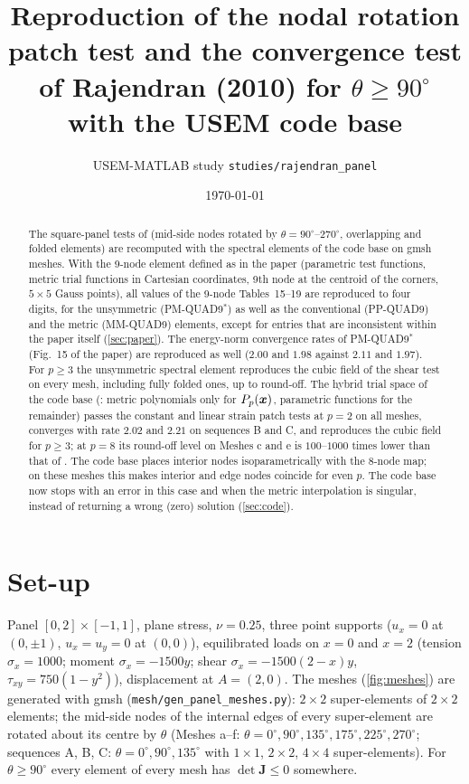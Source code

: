 \documentclass[10pt,a4paper]{article}
\title{Reproduction of the nodal rotation patch test and the convergence test of
       Rajendran (2010) for $\theta\ge90^\circ$ with the USEM code base}
\author{USEM-MATLAB study \texttt{studies/rajendran\_panel}}
\date{\today}
\begin{document}
\maketitle

\begin{abstract}
\noindent
The square-panel tests of \citet[Secs.~5.5--5.7]{Rajendran2010technique} (mid-side nodes
rotated by $\theta=90^\circ$--$270^\circ$, overlapping and folded elements) are recomputed
with the spectral elements of the code base on gmsh meshes. With the 9-node element defined
as in the paper (parametric test functions, metric trial functions in Cartesian coordinates,
9th node at the centroid of the corners, $5\times5$ Gauss points), all values of the 9-node
Tables~15--19 are reproduced to four digits, for the unsymmetric (PM-QUAD9$^\ast$) as well as
the conventional (PP-QUAD9) and the metric (MM-QUAD9) elements, except for entries that are
inconsistent within the paper itself (\cref{sec:paper}). The energy-norm convergence rates of
PM-QUAD9$^\ast$ (Fig.~15 of the paper) are reproduced as well ($2.00$ and $1.98$ against
$2.11$ and $1.97$). For $p\ge3$ the unsymmetric spectral element reproduces the cubic field of
the shear test on every mesh, including fully folded ones, up to round-off. The hybrid trial
space of the code base (\PH: metric polynomials only for $P_p(\bm{x})$, parametric functions for the
remainder) passes the constant and linear strain patch tests at $p=2$ on all meshes, converges
with rate $2.02$ and $2.21$ on sequences B and C, and reproduces the cubic field for $p\ge3$; at $p=8$
its round-off level on Meshes c and e is $100$--$1000$ times lower than that of \PM. The code base places interior nodes
isoparametrically with the 8-node map; on these meshes this makes interior and edge nodes
coincide for even $p$. The code base now stops with an error in this case and when the metric
interpolation is singular, instead of returning a wrong (zero) solution (\cref{sec:code}).
\end{abstract}

\section{Set-up}\label{sec:setup}
Panel $[0,2]\times[-1,1]$, plane stress, $\nu=0.25$, three point supports ($u_x=0$ at
$(0,\pm1)$, $u_x=u_y=0$ at $(0,0)$), equilibrated loads on $x=0$ and $x=2$ (tension
$\sigma_x=1000$; moment $\sigma_x=-1500y$; shear $\sigma_x=-1500(2-x)y$,
$\tau_{xy}=750(1-y^2)$), displacement at $A=(2,0)$. The meshes (\cref{fig:meshes}) are
generated with gmsh (\texttt{mesh/gen\_panel\_meshes.py}): $2\times2$ super-elements of
$2\times2$ elements; the mid-side nodes of the internal edges of every super-element are
rotated about its centre by $\theta$ (Meshes a--f: $\theta=0^\circ,90^\circ,135^\circ,175^\circ,
225^\circ,270^\circ$; sequences A, B, C: $\theta=0^\circ,90^\circ,135^\circ$ with $1\times1$,
$2\times2$, $4\times4$ super-elements). For $\theta\ge90^\circ$ every element of every mesh has
$\det\bm J\le0$ somewhere.
\end{document}
